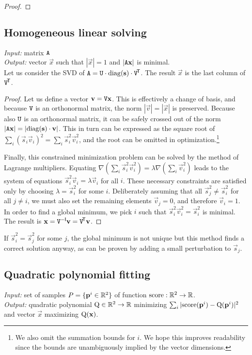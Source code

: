 \begin{proof}
\todo{\dots}
\end{proof}

\subsection{Homogeneous linear solving}
\textit{Input:} matrix $\mathtt{A}$\\
\textit{Output:} vector $\vec x$ such that $|\vec x| = 1$ and $|\mathtt{A} \mathbf{x}|$ is minimal.\\

Let us consider the SVD of $\mathtt{A} = \mathtt{U} \cdot \mathrm{diag}(\mathbf{s}) \cdot \mathtt{V}^{\!\mathsf{T}}$.
The result $\vec x$ is the last column of $\mathtt{V} ^{\!\mathsf{T}}$.

\begin{proof}
Let us define a vector $\mathbf{v} = \mathtt{V} \mathbf{x}$.
This is effectively a change of basis, and because $\mathtt{V}$ is an orthonormal matrix, the norm $|\vec v| = |\vec x|$ is preserved.
Because also $\mathtt{U}$ is an orthonormal matrix, it can be safely crossed out of the norm $|\mathtt{A} \mathbf{x}| = |\mathrm{diag}(\mathbf{s}) \cdot \mathbf{v}|$.
This in turn can be expressed as the square root of $\sum_i (\vec s_i \vec v_i)^2 = \sum_i \vec s_i^2 \vec v_i^2$, and the root can be omitted in optimization.\footnote{
We also omit the summation bounds for $i$. We hope this improves readability since the bounds are unambiguously implied by the vector dimensions.
}

Finally, this constrained minimization problem can be solved by the method of Lagrange multipliers.
Equating $\nabla(\sum_i \vec s_i^2 \vec v_i^2) = \lambda \nabla (\sum_i \vec v_i^2)$ leads to the system of equations $\vec s_i^2 \vec v_i = \lambda \vec v_i$ for all $i$.
These necessary constraints are satisfied only by choosing $\lambda = \vec s_i^2$ for some $i$.
Deliberately assuming that all $\vec s_j^2 \neq \vec s_i^2$ for all $j \neq i$, we must also set the remaining elements $\vec v_j = 0$, and therefore $\vec v_i = 1$.
In order to find a global minimum, we pick $i$ such that $\vec s_i^2 \vec v_i^2 = \vec s_i^2$ is minimal.
The result is $\mathbf{x} = \mathtt{V} ^{-\mathsf{I}} \mathbf{v} = \mathtt{V} ^{\!\mathsf{T}} \mathbf{v}$.
\end{proof}

If $\vec s_i^2 = \vec s_j^2$ for some $j$, the global minimum is not unique but this method finds a correct solution anyway, as can be proven by adding a small perturbation to $\vec s_j$.

\subsection{Quadratic polynomial fitting}
\textit{Input:} set of samples $P = \{\mathbf{p}^i \in \mathbb{R}^2 \}$ of function $\textrm{score}: \mathbb{R}^2 \to \mathbb{R}$.\\
\textit{Output:} quadratic polynomial $\mathrm{Q} \in \mathbb{R}^2 \to \mathbb{R}$ minimizing $\sum_i |\mathrm{score}(\mathbf{p}^i) - \mathrm{Q}(\mathbf{p}^i)|^2$ and vector $\vec x$ maximizing $\mathrm{Q}(\mathbf{x})$.\\

